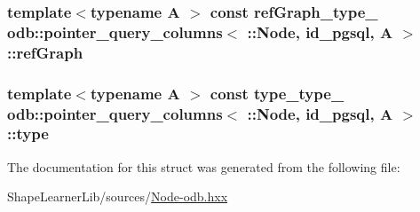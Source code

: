 \subsubsection[{ref\+Graph}]{\setlength{\rightskip}{0pt plus 5cm}template$<$typename A $>$ const {\bf ref\+Graph\+\_\+type\+\_\+} odb\+::pointer\+\_\+query\+\_\+columns$<$ \+::{\bf Node}, id\+\_\+pgsql, A $>$\+::ref\+Graph\hspace{0.3cm}{\ttfamily [static]}}\label{structodb_1_1pointer__query__columns_3_01_1_1_node_00_01id__pgsql_00_01_a_01_4_af056f86eb439af9b32a808ed5b6e54a8}
\hypertarget{structodb_1_1pointer__query__columns_3_01_1_1_node_00_01id__pgsql_00_01_a_01_4_a32027d8e0ebb06676ebd59b6fe581f1b}{}
\subsubsection[{type}]{\setlength{\rightskip}{0pt plus 5cm}template$<$typename A $>$ const {\bf type\+\_\+type\+\_\+} odb\+::pointer\+\_\+query\+\_\+columns$<$ \+::{\bf Node}, id\+\_\+pgsql, A $>$\+::type\hspace{0.3cm}{\ttfamily [static]}}\label{structodb_1_1pointer__query__columns_3_01_1_1_node_00_01id__pgsql_00_01_a_01_4_a32027d8e0ebb06676ebd59b6fe581f1b}


The documentation for this struct was generated from the following file\+:\begin{DoxyCompactItemize}
\item 
Shape\+Learner\+Lib/sources/\hyperlink{_node-odb_8hxx}{Node-\/odb.\+hxx}\end{DoxyCompactItemize}
